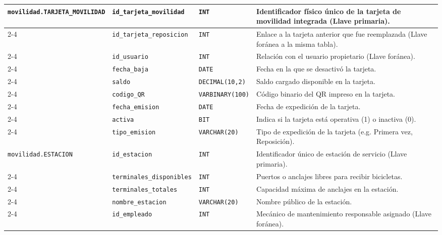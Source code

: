 \begin{longtable}{|p{3.2cm}|p{2.7cm}|p{3.0cm}|p{6.0cm}|}
	\texttt{movilidad.TARJETA\_MOVILIDAD} & \texttt{id\_tarjeta\_movilidad} & \texttt{INT} & Identificador físico único de la tarjeta de movilidad integrada (Llave primaria). \\ \cline{2-4}
	& \texttt{id\_tarjeta\_reposicion} & \texttt{INT} & Enlace a la tarjeta anterior que fue reemplazada (Llave foránea a la misma tabla). \\ \cline{2-4}
	& \texttt{id\_usuario} & \texttt{INT} & Relación con el usuario propietario (Llave foránea). \\ \cline{2-4}
	& \texttt{fecha\_baja} & \texttt{DATE} & Fecha en la que se desactivó la tarjeta. \\ \cline{2-4}
	& \texttt{saldo} & \texttt{DECIMAL(10,2)} & Saldo cargado disponible en la tarjeta. \\ \cline{2-4}
	& \texttt{codigo\_QR} & \texttt{VARBINARY(100)} & Código binario del QR impreso en la tarjeta. \\ \cline{2-4}
	& \texttt{fecha\_emision} & \texttt{DATE} & Fecha de expedición de la tarjeta. \\ \cline{2-4}
	& \texttt{activa} & \texttt{BIT} & Indica si la tarjeta está operativa (1) o inactiva (0). \\ \cline{2-4}
	& \texttt{tipo\_emision} & \texttt{VARCHAR(20)} & Tipo de expedición de la tarjeta (e.g. Primera vez, Reposición). \\ \hline
	
	\texttt{movilidad.ESTACION} & \texttt{id\_estacion} & \texttt{INT} & Identificador único de estación de servicio (Llave primaria). \\ \cline{2-4}
	& \texttt{terminales\_disponibles} & \texttt{INT} & Puertos o anclajes libres para recibir bicicletas. \\ \cline{2-4}
	& \texttt{terminales\_totales} & \texttt{INT} & Capacidad máxima de anclajes en la estación. \\ \cline{2-4}
	& \texttt{nombre\_estacion} & \texttt{VARCHAR(20)} & Nombre público de la estación. \\ \cline{2-4}
	& \texttt{id\_empleado} & \texttt{INT} & Mecánico de mantenimiento responsable asignado (Llave foránea). \\ \hline
	

\end{longtable}
